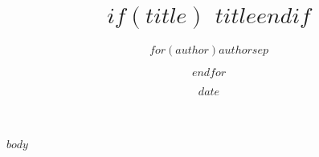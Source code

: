 \documentclass[11pt, a4paper, english]{article}
\begin{document}
\setlength{\parindent}{0cm}
\title{$if(title)$ $title$$endif$}
\author{$for(author)$$author$$sep$ \and $endfor$}
\date{$date$}
\maketitle 
$body$
\end{document}
